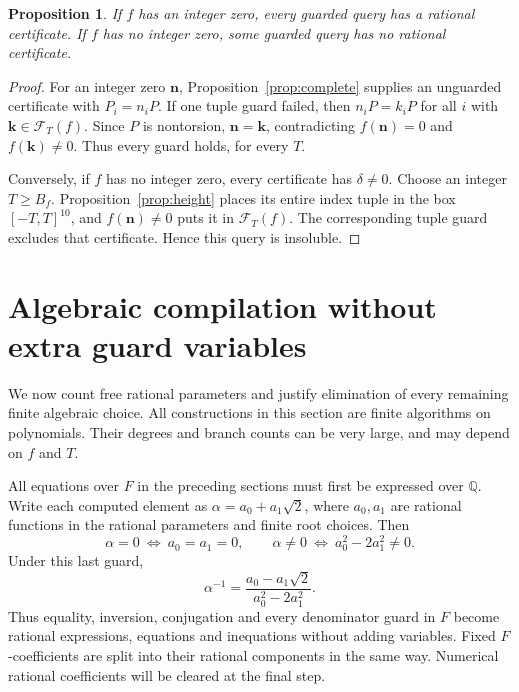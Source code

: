 \documentclass[11pt,reqno]{amsart}
\newtheorem{proposition}[theorem]{Proposition}
\theoremstyle{definition}
\numberwithin{equation}{section}
\newcommand{\Q}{\mathbb Q}
\begin{document}
\begin{proposition}\label{prop:queries}
If $f$ has an integer zero, every guarded query has a rational certificate. If $f$ has no integer zero, some guarded query has no rational certificate.
\end{proposition}
\begin{proof}
For an integer zero $\mathbf n$, Proposition~\ref{prop:complete} supplies an unguarded certificate with $P_i=n_iP$. If one tuple guard failed, then $n_iP=k_iP$ for all $i$ with $\mathbf k\in\mathcal F_T(f)$. Since $P$ is nontorsion, $\mathbf n=\mathbf k$, contradicting $f(\mathbf n)=0$ and $f(\mathbf k)\ne0$. Thus every guard holds, for every $T$.

Conversely, if $f$ has no integer zero, every certificate has $\delta\ne0$. Choose an integer $T\ge B_f$. Proposition~\ref{prop:height} places its entire index tuple in the box $[-T,T]^{10}$, and $f(\mathbf n)\ne0$ puts it in $\mathcal F_T(f)$. The corresponding tuple guard excludes that certificate. Hence this query is insoluble.
\end{proof}


\section{Algebraic compilation without extra guard variables}\label{sec:encoding}

We now count free rational parameters and justify elimination of every remaining finite algebraic choice. All constructions in this section are finite algorithms on polynomials. Their degrees and branch counts can be very large, and may depend on $f$ and $T$.

All equations over $F$ in the preceding sections must first be expressed over $\Q$. Write each computed element as $\alpha=a_0+a_1\sqrt2$, where $a_0,a_1$ are rational functions in the rational parameters and finite root choices. Then
\[
 \alpha=0\ \Longleftrightarrow\ a_0=a_1=0,
 \qquad
 \alpha\ne0\ \Longleftrightarrow\ a_0^2-2a_1^2\ne0.
\]
Under this last guard,
\[
 \alpha^{-1}=\frac{a_0-a_1\sqrt2}{a_0^2-2a_1^2}.
\]
Thus equality, inversion, conjugation and every denominator guard in $F$ become rational expressions, equations and inequations without adding variables. Fixed $F$-coefficients are split into their rational components in the same way. Numerical rational coefficients will be cleared at the final step.
\end{document}
